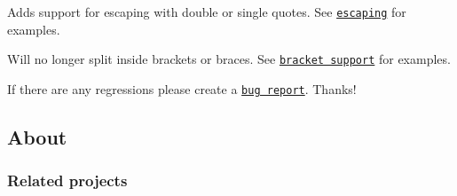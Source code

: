 \begin{DoxyItemize}
\item Adds support for escaping with double or single quotes. See \href{#escaping}{\tt escaping} for examples.
\item Will no longer split inside brackets or braces. See \href{#bracket-support}{\tt bracket support} for examples.
\end{DoxyItemize}

If there are any regressions please create a \href{../../issues/new}{\tt bug report}. Thanks!

\subsection*{About}

\subsubsection*{Related projects}


